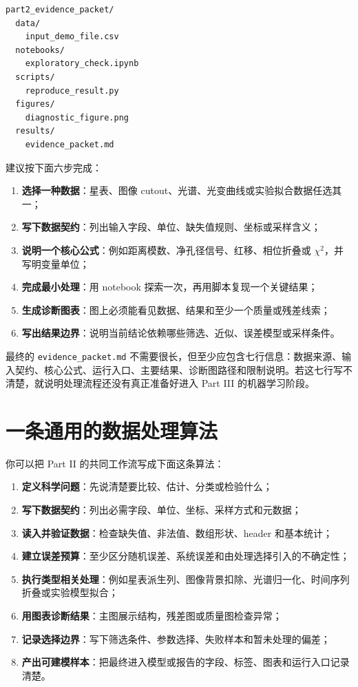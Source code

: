 \begin{examplebox}
\begin{lstlisting}[style=terminal]
part2_evidence_packet/
  data/
    input_demo_file.csv
  notebooks/
    exploratory_check.ipynb
  scripts/
    reproduce_result.py
  figures/
    diagnostic_figure.png
  results/
    evidence_packet.md
\end{lstlisting}
\end{examplebox}

建议按下面六步完成：

\begin{enumerate}
    \item \textbf{选择一种数据}：星表、图像 cutout、光谱、光变曲线或实验拟合数据任选其一；
    \item \textbf{写下数据契约}：列出输入字段、单位、缺失值规则、坐标或采样含义；
    \item \textbf{说明一个核心公式}：例如距离模数、净孔径信号、红移、相位折叠或 \(\chi^2\)，并写明变量单位；
    \item \textbf{完成最小处理}：用 notebook 探索一次，再用脚本复现一个关键结果；
    \item \textbf{生成诊断图表}：图上必须能看见数据、结果和至少一个质量或残差线索；
    \item \textbf{写出结果边界}：说明当前结论依赖哪些筛选、近似、误差模型或采样条件。
\end{enumerate}

最终的 \texttt{evidence\_packet.md} 不需要很长，但至少应包含七行信息：数据来源、输入契约、核心公式、运行入口、主要结果、诊断图路径和限制说明。若这七行写不清楚，就说明处理流程还没有真正准备好进入 Part III 的机器学习阶段。

\section*{一条通用的数据处理算法}

你可以把 Part II 的共同工作流写成下面这条算法：

\begin{enumerate}
    \item \textbf{定义科学问题}：先说清楚要比较、估计、分类或检验什么；
    \item \textbf{写下数据契约}：列出必需字段、单位、坐标、采样方式和元数据；
    \item \textbf{读入并验证数据}：检查缺失值、非法值、数组形状、header 和基本统计；
    \item \textbf{建立误差预算}：至少区分随机误差、系统误差和由处理选择引入的不确定性；
    \item \textbf{执行类型相关处理}：例如星表派生列、图像背景扣除、光谱归一化、时间序列折叠或实验模型拟合；
    \item \textbf{用图表诊断结果}：主图展示结构，残差图或质量图检查异常；
    \item \textbf{记录选择边界}：写下筛选条件、参数选择、失败样本和暂未处理的偏差；
    \item \textbf{产出可建模样本}：把最终进入模型或报告的字段、标签、图表和运行入口记录清楚。
\end{enumerate}

